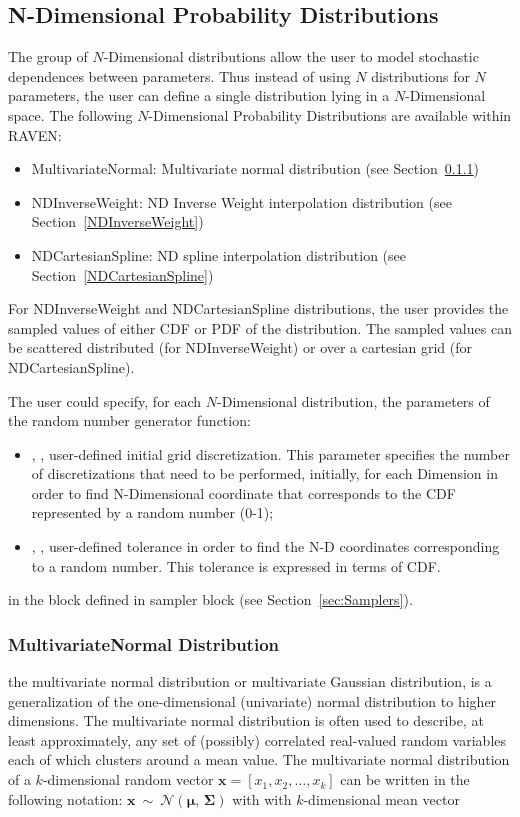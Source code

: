 \subsection{N-Dimensional Probability Distributions}
\label{subsec:NdDist}
The group of $N$-Dimensional distributions allow the user to model stochastic dependences between parameters. Thus instead of using $N$ distributions for $N$ parameters, the user can define a single distribution lying in a $N$-Dimensional space.
The following $N$-Dimensional Probability Distributions are available within RAVEN:
\begin{itemize}
\item MultivariateNormal: Multivariate normal distribution (see Section~\ref{MultivariateNormal})
\item NDInverseWeight: ND Inverse Weight interpolation distribution (see Section~\ref{NDInverseWeight})
\item NDCartesianSpline: ND spline interpolation distribution (see Section~\ref{NDCartesianSpline})
\end{itemize}
For NDInverseWeight and NDCartesianSpline distributions, the user provides the sampled values of either CDF or PDF of the distribution. The sampled values can be scattered distributed (for NDInverseWeight) or over a cartesian grid (for NDCartesianSpline).

The user could specify, for each $N$-Dimensional distribution, the parameters of the random number generator function:
\begin{itemize}
\item {}, , user-defined initial grid discretization. This parameter specifies the number of discretizations that need to be performed, initially, for each Dimension in
order to find N-Dimensional coordinate that corresponds to the CDF represented by a random number (0-1);
\item {}, , user-defined tolerance in order to find the N-D coordinates corresponding to a random number. This tolerance is expressed in terms of CDF.
\end{itemize}
in the  block defined in sampler block  (see Section~\ref{sec:Samplers}).

\subsubsection{MultivariateNormal Distribution}
\label{MultivariateNormal}
the multivariate normal distribution or multivariate Gaussian distribution, is a generalization of the one-dimensional (univariate) normal distribution to higher dimensions.
The multivariate normal distribution is often used to describe, at least approximately, any set of (possibly) correlated real-valued random variables each of which clusters around a mean value.
The multivariate normal distribution of a $k$-dimensional random vector $\mathbf{x} = [x_1, x_2, …, x_k]$  can be written in the following notation:
$ \mathbf{x}\ \sim\ \mathcal{N}(\boldsymbol\mu,\, \boldsymbol\Sigma)$
with with $k$-dimensional mean vector

